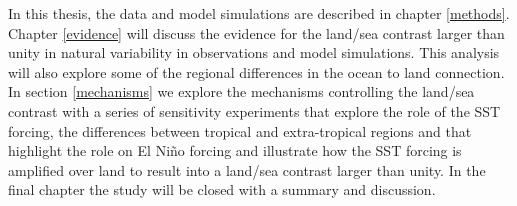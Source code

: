 In this thesis, the data and model simulations are described in chapter 
\ref{methods}.  Chapter \ref{evidence} will discuss the evidence for the 
land/sea contrast larger than unity in natural variability in observations and 
model simulations. This analysis will also explore some of the regional 
differences in the ocean to land connection. In section \ref{mechanisms} we 
explore the mechanisms controlling the land/sea contrast with a series of 
sensitivity experiments that explore the role of the SST forcing, the 
differences between tropical and extra-tropical regions and that highlight the 
role on El Ni{\~n}o forcing and illustrate how the SST forcing is amplified over 
land to result into a land/sea contrast larger than unity. In the final chapter 
the study will be closed with a summary and discussion.

